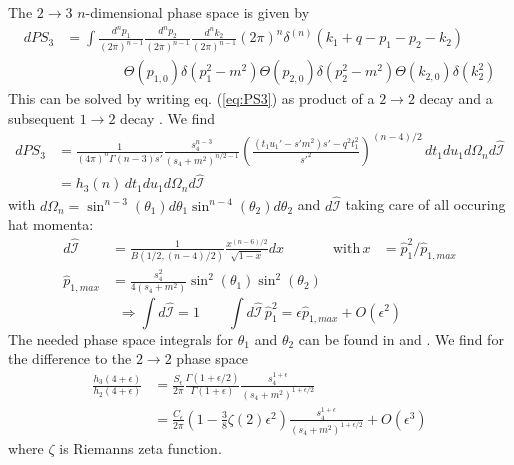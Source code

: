 The $2\rightarrow 3$ $n$-dimensional phase space is given by
\begin{align}
dPS_3 &= \!\int\!\!\frac{d^{n}p_1}{(2\pi)^{n-1}}\frac{d^{n}p_2}{(2\pi)^{n-1}}\frac{d^{n}k_2}{(2\pi)^{n-1}}(2\pi)^n\delta^{(n)}(k_1+q-p_1-p_2-k_2) \nonumber\\
 &\hspace{50pt}\Theta(p_{1,0})\delta(p_1^2-m^2)\Theta(p_{2,0})\delta(p_2^2-m^2)\Theta(k_{2,0})\delta(k_2^2) \label{eq:PS3}
\end{align}
This can be solved by writing eq. (\ref{eq:PS3}) as product of a $2\rightarrow 2$ decay and a subsequent $1\rightarrow 2$ decay \cite{PhysRevD4054}. We find
\begin{align}
dPS_3 &= \frac 1 {(4\pi)^n\Gamma(n-3)s'} \frac{s_4^{n-3}}{(s_4+m^2)^{n/2-1}}\left(\frac{(t_1u_1'-s'm^2)s' - q^2t_1^2}{s'^2}\right)^{(n-4)/2}\,dt_1 du_1 d\Omega_n d\hat{\mathcal I}\\
 &=h_3(n)\,dt_1 du_1 d\Omega_n d\hat{\mathcal I}
\end{align}
with $d\Omega_n = \sin^{n-3}(\theta_1)d\theta_1\sin^{n-4}(\theta_2)d\theta_2$ and $d\hat{\mathcal I}$ taking care of all occuring hat momenta:
\begin{align}
d\hat{\mathcal I} &= \frac 1 {B(1/2,(n-4)/2)}\frac{x^{(n-6)/2}}{\sqrt{1-x}}dx &\text{with}\,x &= \hat p_1^2/\hat p_{1,max}\\
\hat p_{1,max} &= \frac{s_4^2}{4(s_4+m^2)}\sin^2(\theta_1)\sin^2(\theta_2)
\end{align}
\begin{equation}
\Rightarrow \int\!d\hat{\mathcal I} = 1 \qquad \int\!d\hat{\mathcal I}\,\hat p_1^2 = \epsilon \hat p_{1,max} + O(\epsilon^2)
\end{equation}
The needed phase space integrals for $\theta_1$ and $\theta_2$ can be found in \cite{PhysRevD4054} and \cite{Bojak:2000eu}. We find for the difference to the $2\rightarrow 2$ phase space
\begin{align}
\frac{h_3(4+\epsilon)}{h_2(4+\epsilon)} &= \frac{S_\epsilon}{2\pi} \frac{\Gamma(1+\epsilon/2)}{\Gamma(1+\epsilon)} \frac{s_4^{1+\epsilon}}{(s_4+m^2)^{1+\epsilon/2}}\\
 &= \frac{C_\epsilon}{2\pi}\left(1-\frac 3 8 \zeta(2)\epsilon^2\right)\frac{s_4^{1+\epsilon}}{(s_4+m^2)^{1+\epsilon/2}} + O(\epsilon^3)
\end{align}
where $\zeta$ is Riemanns zeta function.

